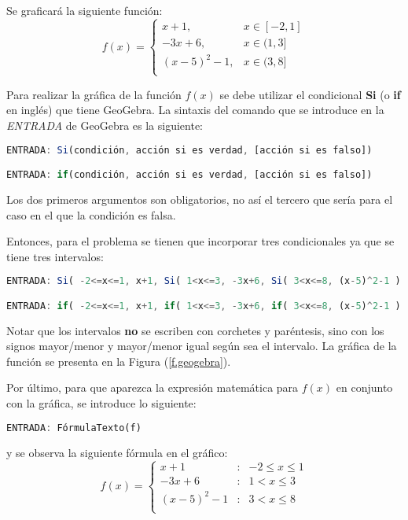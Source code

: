 Se graficará la siguiente función:
\[
f(x) = \left\{
      \begin{array}{ll}
	x+1, & x \in [-2,1] \\
	-3x+6, & x \in (1,3] \\
	(x-5)^2-1, & x \in (3,8] \\
      \end{array}
      \right.
\]

Para realizar la gráfica de la función $f(x)$ se debe utilizar el condicional
{\bf Si} (o \textbf{if} en inglés) que tiene GeoGebra. La sintaxis del comando que se
introduce en la \emph{ENTRADA} de GeoGebra es la siguiente:

\begin{lstlisting}[frame=single,language=octave,caption=\small Código a
utilizar.]
ENTRADA: Si(condición, acción si es verdad, [acción si es falso])

ENTRADA: if(condición, acción si es verdad, [acción si es falso])
\end{lstlisting}
Los dos primeros argumentos son obligatorios, no así el tercero que sería para
el caso en el que la condición es falsa.

Entonces, para el problema se tienen que incorporar tres condicionales ya que se
tiene tres intervalos:

\footnotesize
\begin{lstlisting}[frame=single,language=octave,caption=\small Código que se
ingresa en la \emph{ENTRADA} de GeoGebra para graficar $f(x)$.]
ENTRADA: Si( -2<=x<=1, x+1, Si( 1<x<=3, -3x+6, Si( 3<x<=8, (x-5)^2-1 ) ) )

ENTRADA: if( -2<=x<=1, x+1, if( 1<x<=3, -3x+6, if( 3<x<=8, (x-5)^2-1 ) ) )
\end{lstlisting}
\normalsize
Notar que los intervalos \textbf{no} se escriben con corchetes y paréntesis,
sino con los signos \mbox{mayor/menor} y mayor/menor igual según sea el
intervalo. La gráfica de la función se presenta en la Figura (\ref{f.geogebra}).



Por último, para que aparezca la expresión matemática para $f(x)$ en conjunto
con la gráfica, se introduce lo siguiente:
\begin{lstlisting}[frame=single,language=octave,caption=\small En caso que la 
función se llame $f$ que corresponde al objeto dentro del paréntesis.]
ENTRADA: FórmulaTexto(f) 
\end{lstlisting}
y se observa la siguiente fórmula en el gráfico:
\[
f(x) = \left\{
      \begin{array}{lcl}
	x+1 &:& -2\le x \le 1 \\
	-3x+6 &:& 1<x\le3 \\
	(x-5)^2-1 &:& 3<x\le8 \\
      \end{array}
      \right.
\]




